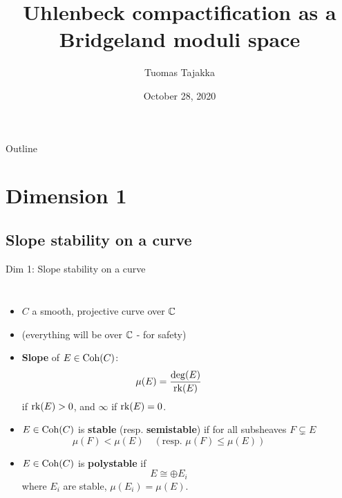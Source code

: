 \documentclass[8pt]{beamer} %
\title{Uhlenbeck compactification as a Bridgeland moduli space}
\author{Tuomas Tajakka}
\institute{University of Washington}
\date{October 28, 2020}
\begin{document}
\begin{frame}
    \titlepage
\end{frame}

\begin{frame}{Outline}
    \tableofcontents    
\end{frame}

\section{Dimension 1}
\subsection{Slope stability on a curve}
\begin{frame}[fragile]{Dim 1: Slope stability on a curve}
\begin{columns}[t]
    \begin{itemize}
        \item<2-> $C$ a smooth, projective curve over $\mathbb{C}$
        \item<3-> (everything will be over $\mathbb{C}$ - for safety)
        \item<4-> \textbf{Slope} of $E \in \mathrm{Coh}(C)$:
        \[ \mu(E) = \frac{\deg(E)}{\operatorname{\mathrm{rk}}(E)} \]
        if $\operatorname{\mathrm{rk}}(E) > 0$, and $\infty$ if $\operatorname{\mathrm{rk}}(E) = 0$.
        \item<5-> $E \in \mathrm{Coh}(C)$ is \textbf{stable} (resp. \textbf{semistable}) if for all subsheaves $F \subsetneq E$
        \[ \mu(F) < \mu(E) \quad (\text{resp. } \mu(F) \le \mu(E)) \]
        \item<6-> $E \in \mathrm{Coh}(C)$ is \textbf{polystable} if
        \[ E \cong \oplus E_i \]
        where $E_i$ are stable, $\mu(E_i) = \mu(E)$.
    \end{itemize}
    

\end{columns}
\end{frame}
\end{document}
